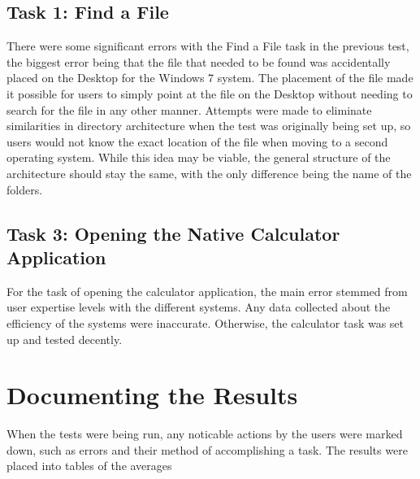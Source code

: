 \documentclass[11pt,letterpaper]{report}
\begin{document}
\subsection{Task 1: Find a File}
There were some significant errors with the Find a File task in the previous test, the biggest error being that the file that needed to be found was accidentally placed on the Desktop for the Windows 7 system. The placement of the file made it possible for users to simply point at the file on the Desktop without needing to search for the file in any other manner. Attempts were made to eliminate similarities in directory architecture when the test was originally being set up, so users would not know the exact location of the file when moving to a second operating system. While this idea may be viable, the general structure of the architecture should stay the same, with the only difference being the name of the folders. 

\subsection{Task 3: Opening the Native Calculator Application}
For the task of opening the calculator application, the main error stemmed from user expertise levels with the different systems. Any data collected about the efficiency of the systems were inaccurate. Otherwise, the calculator task was set up and tested decently.

\section{Documenting the Results}
When the tests were being run, any noticable actions by the users were marked down, such as errors and their method of accomplishing a task. The results were placed into tables of the averages 
\end{document}
